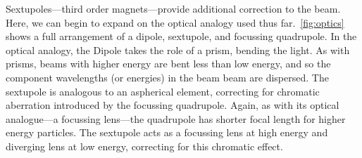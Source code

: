 \documentclass[11pt]{report}
\begin{document}
Sextupoles---third order magnets---provide additional correction to the beam. Here, we can begin to expand on the optical analogy used thus far.~\autoref{fig:optics} shows a full arrangement of a dipole, sextupole, and focussing quadrupole. In the optical analogy, the Dipole takes the role of a prism, bending the light. As with prisms, beams with higher energy are bent less than low energy, and so the component wavelengths (or energies) in the beam beam are dispersed. The sextupole is analogous to an aspherical element, correcting for chromatic aberration introduced by the focussing quadrupole. Again, as with its optical analogue---a focussing lens---the quadrupole has shorter focal length for higher energy particles. The sextupole acts as a focussing lens at high energy and diverging lens at low energy, correcting for this chromatic effect.
\end{document}
